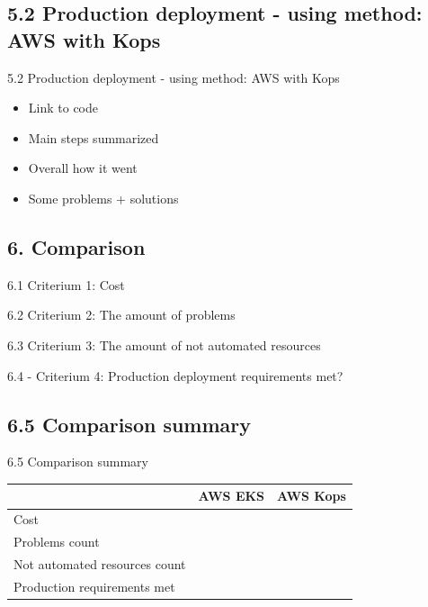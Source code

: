 \documentclass{beamer}
\begin{document}
\subsection{5.2 Production deployment - using method: AWS with Kops}
\begin{frame}{5.2 Production deployment - using method: AWS with Kops}%
\begin{itemize}
	\item Link to code
	\item Main steps summarized
	\item Overall how it went
	\item Some problems + solutions 
\end{itemize}
\end{frame}

\subsection{6. Comparison}
\begin{frame}{6.1 Criterium 1: Cost}%

\end{frame}

\begin{frame}{6.2 Criterium 2: The amount of problems}%

\end{frame}

\begin{frame}{6.3 Criterium 3: The amount of not automated resources}%

\end{frame}

\begin{frame}{6.4 - Criterium 4: Production deployment requirements met?}%

\end{frame}

\subsection{6.5 Comparison summary}
\begin{frame}{6.5 Comparison summary}%
	\begin{tabular}{| l | c | c |}
		\hline
		& AWS EKS & AWS Kops \\
		\hline
		Cost &  &  \\
		\hline
		Problems count &  &  \\
		\hline
		Not automated resources count &  &  \\
		\hline
		Production requirements met &  &  \\
		\hline
		\end{tabular}
\end{frame}
\end{document}
